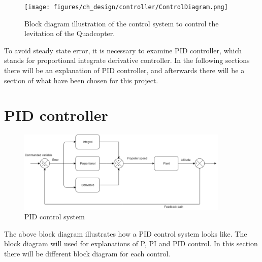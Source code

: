  \begin{figure}[H]
     \centering
     \texttt{[image: figures/ch\_design/controller/ControlDiagram.png]}
     \caption{Block diagram illustration of the control system  to control the levitation of the Quadcopter.}
     \label{fig:controlDiagram}
 \end{figure}

To avoid steady state error, it is necessary to examine PID controller, which stands for proportional integrate derivative controller. In the following sections there will be an explanation of PID controller, and afterwards there will be a section of what have been chosen for this project.  


\section{PID controller} %
\begin{figure}[H]
    \centering
    \includegraphics[width=0.9\textwidth]{figures/ch_design/PIDControl.png}
    \caption{PID control system}
    \label{fig:PID_Controller}
\end{figure}
The above block diagram illustrates how a PID control system looks like. The block diagram will used for explanations of P, PI and PID control. In this section there will be different block diagram for each control.

